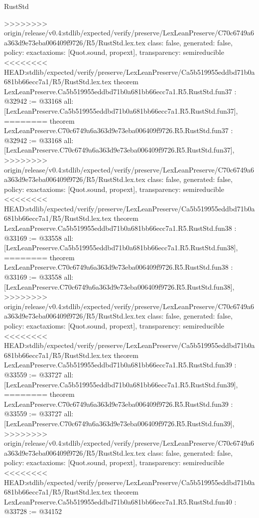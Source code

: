 \begin{lexlean}{RustStd}
\begin{coremodule}
{\begin{coremodule}
{{{{{{{{{{{{{{{{{{{{{{{{{{{{{{{{{{{{{{{{>>>>>>>> origin/release/v0.4:stdlib/expected/verify/preserve/LexLeanPreserve/C70c6749a6a363d9e73eba006409f9726/R5/RustStd.lex.tex
  class: false,
  generated: false,
  policy: exact{axioms: [Quot.sound, propext]},
  transparency: semireducible
}
<<<<<<<< HEAD:stdlib/expected/verify/preserve/LexLeanPreserve/Ca5b519955eddbd71b0a681bb66ecc7a1/R5/RustStd.lex.tex
theorem LexLeanPreserve.Ca5b519955eddbd71b0a681bb66ecc7a1.R5.RustStd.fun37 : @32942 := @33168 {
  all: [LexLeanPreserve.Ca5b519955eddbd71b0a681bb66ecc7a1.R5.RustStd.fun37],
========
theorem LexLeanPreserve.C70c6749a6a363d9e73eba006409f9726.R5.RustStd.fun37 : @32942 := @33168 {
  all: [LexLeanPreserve.C70c6749a6a363d9e73eba006409f9726.R5.RustStd.fun37],
>>>>>>>> origin/release/v0.4:stdlib/expected/verify/preserve/LexLeanPreserve/C70c6749a6a363d9e73eba006409f9726/R5/RustStd.lex.tex
  class: false,
  generated: false,
  policy: exact{axioms: [Quot.sound, propext]},
  transparency: semireducible
}
<<<<<<<< HEAD:stdlib/expected/verify/preserve/LexLeanPreserve/Ca5b519955eddbd71b0a681bb66ecc7a1/R5/RustStd.lex.tex
theorem LexLeanPreserve.Ca5b519955eddbd71b0a681bb66ecc7a1.R5.RustStd.fun38 : @33169 := @33558 {
  all: [LexLeanPreserve.Ca5b519955eddbd71b0a681bb66ecc7a1.R5.RustStd.fun38],
========
theorem LexLeanPreserve.C70c6749a6a363d9e73eba006409f9726.R5.RustStd.fun38 : @33169 := @33558 {
  all: [LexLeanPreserve.C70c6749a6a363d9e73eba006409f9726.R5.RustStd.fun38],
>>>>>>>> origin/release/v0.4:stdlib/expected/verify/preserve/LexLeanPreserve/C70c6749a6a363d9e73eba006409f9726/R5/RustStd.lex.tex
  class: false,
  generated: false,
  policy: exact{axioms: [Quot.sound, propext]},
  transparency: semireducible
}
<<<<<<<< HEAD:stdlib/expected/verify/preserve/LexLeanPreserve/Ca5b519955eddbd71b0a681bb66ecc7a1/R5/RustStd.lex.tex
theorem LexLeanPreserve.Ca5b519955eddbd71b0a681bb66ecc7a1.R5.RustStd.fun39 : @33559 := @33727 {
  all: [LexLeanPreserve.Ca5b519955eddbd71b0a681bb66ecc7a1.R5.RustStd.fun39],
========
theorem LexLeanPreserve.C70c6749a6a363d9e73eba006409f9726.R5.RustStd.fun39 : @33559 := @33727 {
  all: [LexLeanPreserve.C70c6749a6a363d9e73eba006409f9726.R5.RustStd.fun39],
>>>>>>>> origin/release/v0.4:stdlib/expected/verify/preserve/LexLeanPreserve/C70c6749a6a363d9e73eba006409f9726/R5/RustStd.lex.tex
  class: false,
  generated: false,
  policy: exact{axioms: [Quot.sound, propext]},
  transparency: semireducible
}
<<<<<<<< HEAD:stdlib/expected/verify/preserve/LexLeanPreserve/Ca5b519955eddbd71b0a681bb66ecc7a1/R5/RustStd.lex.tex
theorem LexLeanPreserve.Ca5b519955eddbd71b0a681bb66ecc7a1.R5.RustStd.fun40 : @33728 := @34152 {
}}}}}}}}}}}}}}}}}}}}}}}}}}}}}}}}}}}}}}}}}}}
\end{coremodule}}
\end{coremodule}
\end{lexlean}
